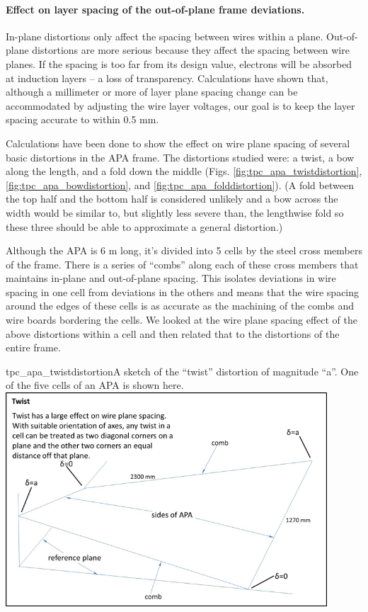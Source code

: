 \paragraph{Effect on layer spacing of the out-of-plane frame deviations.}

In-plane distortions only affect the spacing between wires within a plane.  Out-of-plane distortions are more serious because they affect the spacing between wire planes.  If the spacing is too far from its design value, electrons will be absorbed at induction layers -- a loss of transparency.  Calculations have shown that, although a millimeter or more of layer plane spacing change can be accommodated by adjusting the wire layer voltages, our goal is to keep the layer spacing accurate to within 0.5 mm.

Calculations have been done to show the effect on wire plane spacing of several basic distortions in the APA frame.  The distortions studied were: a twist, a bow along the length, and a fold down the middle (Figs. \ref{fig:tpc_apa_twistdistortion}, \ref{fig:tpc_apa_bowdistortion}, and \ref{fig:tpc_apa_folddistortion}).  (A fold between the top half and the bottom half is considered unlikely and a bow across the width would be similar to, but slightly less severe than, the lengthwise fold so these three should be able to approximate a general distortion.)

Although the APA is 6 m long, it's divided into 5 cells by the steel cross members of the frame.  There is a series of ``combs'' along each of these cross members that maintains in-plane and out-of-plane spacing.  This isolates deviations in wire spacing in one cell from deviations in the others and means that the wire spacing around the edges of these cells is as accurate as the machining of the combs and wire boards bordering the cells.  We looked at the wire plane spacing effect of the above distortions within a cell and then related that to the distortions of the entire frame.

\begin{cdrfigure}{tpc_apa_twistdistortion}{A sketch of the ``twist'' distortion of magnitude ``a''.  One of the five cells of an APA is shown here.}
\includegraphics[width=0.9\textwidth]{figures/tpc_apa_twistdistortion.png} 
\end{cdrfigure}

